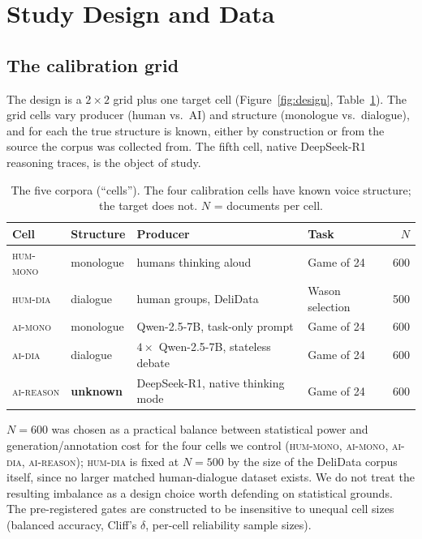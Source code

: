 \documentclass[11pt]{article}
\newcommand{\cellhm}{\textsc{hum-mono}}
\newcommand{\cellhd}{\textsc{hum-dia}}
\newcommand{\cellad}{\textsc{ai-dia}}
\newcommand{\cellam}{\textsc{ai-mono}}
\newcommand{\cellrt}{\textsc{ai-reason}}
\begin{document}
\section{Study Design and Data}
\label{sec:design}

\subsection{The calibration grid}
\label{sec:grid}

The design is a $2{\times}2$ grid plus one target cell
(Figure~\ref{fig:design}, Table~\ref{tab:cells}). The grid cells vary
producer (human vs.\ AI) and structure (monologue vs.\ dialogue), and for
each the true structure is known, either by construction or from the source
the corpus was collected from. The fifth cell, native DeepSeek-R1 reasoning
traces, is the object of study.

\begin{table}[t]
\centering
\caption{The five corpora (``cells''). The four calibration cells have known
voice structure; the target does not. $N$ = documents per cell.}
\label{tab:cells}
\footnotesize
\begin{tabular}{@{}llllr@{}}
\toprule
Cell & Structure & Producer & Task & $N$ \\
\midrule
\cellhm{} & monologue & humans thinking aloud \citep{wurgaft2025thinkaloud} & Game of 24 & 600 \\
\cellhd{} & dialogue & human groups, DeliData \citep{karadzhov2023delidata} & Wason selection & 500 \\
\cellam{} & monologue & Qwen-2.5-7B, task-only prompt & Game of 24 & 600 \\
\cellad{} & dialogue & $4\times$ Qwen-2.5-7B, stateless debate & Game of 24 & 600 \\
\midrule
\cellrt{} & \textbf{unknown} & DeepSeek-R1, native thinking mode & Game of 24 & 600 \\
\bottomrule
\end{tabular}
\end{table}

$N=600$ was chosen as a practical balance between statistical power and
generation/annotation cost for the four cells we control (\cellhm{},
\cellam{}, \cellad{}, \cellrt{}); \cellhd{} is fixed at $N=500$ by the size of
the DeliData corpus itself, since no larger matched human-dialogue dataset
exists. We do not treat the resulting imbalance as a design choice worth
defending on statistical grounds. The pre-registered gates are constructed to
be insensitive to unequal cell sizes (balanced accuracy, Cliff's $\delta$,
per-cell reliability sample sizes).
\end{document}
